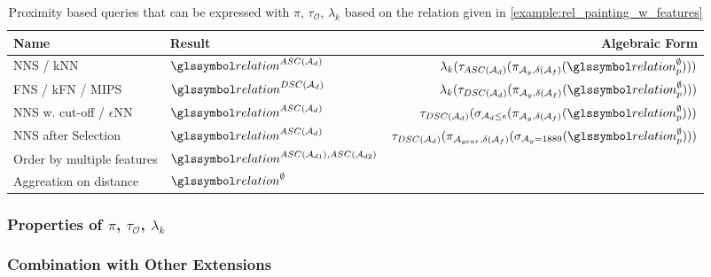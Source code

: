\begin{table}[tb]
    \centering
    \caption{Proximity based queries that can be expressed with $\pi$, $\tau_{\mathcal{O}}$, $\lambda_k$ based on the relation given in \cref{example:rel_painting_w_features} }
    \label{table:proximity_based_queries}
    \begin{tabular}{||l l r ||} 
     \hline
     Name & Result & Algebraic Form \\
     \hline\hline
     NNS / kNN & $\relation^{ASC(\mathcal{A}_d)}$ & $\lambda_k (\tau_{ASC(\mathcal{A}_d)} ( \pi_{\mathcal{A}_{y}, \delta(\mathcal{A}_{f})}  ( \relation_p^{\emptyset})))$  \\ 
     \hline
     FNS / kFN / MIPS & $\relation^{DSC(\mathcal{A}_d)}$ & $\lambda_k (\tau_{DSC(\mathcal{A}_d)} ( \pi_{\mathcal{A}_{y}, \delta(\mathcal{A}_{f})}  ( \relation_p^{\emptyset})))$   \\
     \hline
     NNS w. cut-off / $\epsilon$NN & $\relation^{ASC(\mathcal{A}_d)}$ & $\tau_{DSC(\mathcal{A}_d)} ( \sigma_{\mathcal{A}_d \leq \epsilon} ( \pi_{\mathcal{A}_{y}, \delta(\mathcal{A}_{f})} ( \relation_p^{\emptyset})) )$  \\
     \hline
     NNS after Selection & $\relation^{ASC(\mathcal{A}_d)}$ &  $\tau_{DSC(\mathcal{A}_d)} ( \pi_{\mathcal{A}_{year}, \delta(\mathcal{A}_{f})} ( \sigma_{\mathcal{A}_{y} = 1889} ( \relation_p^{\emptyset})) )$\\
     \hline
     Order by multiple features & $\relation^{ASC(\mathcal{A}_{d1}),ASC(\mathcal{A}_{d2})}$ & \\ 
     \hline
     Aggreation on distance & $\relation^{\emptyset}$ & \\ 
     \hline
    \end{tabular}
\end{table}


\subsubsection{Properties of $\pi$, $\tau_{\mathcal{O}}$, $\lambda_k$}


\subsubsection{Combination with Other Extensions}



